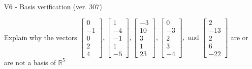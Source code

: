 \begin{exercise}
  \begin{exerciseTitle}V6 - Basis verification (ver. 307)\end{exerciseTitle}
  \begin{exerciseStatement}
    Explain why the vectors \(\left[\begin{array}{r}
0 \\
-1 \\
0 \\
2 \\
4
\end{array}\right] , \left[\begin{array}{r}
1 \\
-4 \\
-1 \\
1 \\
-5
\end{array}\right] , \left[\begin{array}{r}
-3 \\
10 \\
3 \\
1 \\
23
\end{array}\right] , \left[\begin{array}{r}
0 \\
-3 \\
2 \\
3 \\
-4
\end{array}\right] , \text{ and } \left[\begin{array}{r}
2 \\
-13 \\
2 \\
6 \\
-22
\end{array}\right]\) are or are not a basis of \(\mathbb{R}^5\)	



\end{exerciseStatement}
\end{exercise}

